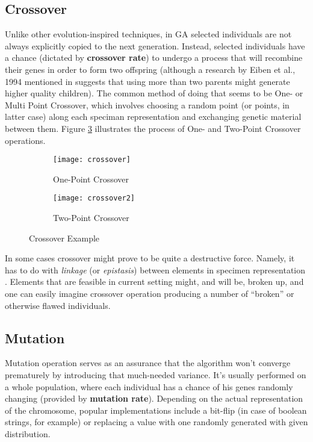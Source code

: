 \subsection{Crossover}
Unlike other evolution-inspired techniques, in GA selected individuals are not always explicitly copied to the next generation. Instead, selected individuals have a chance (dictated by \textbf{crossover rate}) to undergo a process that will recombine their genes in order to form two offspring (although a research by Eiben et al., 1994 mentioned in \cite{ksheperthesis} suggests that using more than two parents might generate higher quality children). The common method of doing that seems to be One- or Multi Point Crossover, which involves choosing a random point (or points, in latter case) along each speciman representation and exchanging genetic material between them. Figure \ref{fig:x crossoverexample} illustrates the process of One- and Two-Point Crossover operations.
\begin{figure}[h]
    \centering
    \begin{subfigure}[b]{0.5\textwidth}
        \centering
        \texttt{[image: crossover]}
        \caption{One-Point Crossover}
        \label{fig:onepointcrossover}
    \end{subfigure}
    \hfill
    \begin{subfigure}[b]{0.5\textwidth}
        \centering
        \texttt{[image: crossover2]}
        \caption{Two-Point Crossover}
        \label{fig:twopointcrossover}
    \end{subfigure}
    \caption{Crossover Example}
    \label{fig:x crossoverexample}
\end{figure}
In some cases crossover might prove to be quite a destructive force. Namely, it has to do with \textit{linkage} (or \textit{epistasis}) between elements in specimen representation \cite{Luke2013Metaheuristics}. Elements that are feasible in current setting might, and will be, broken up, and one can easily imagine crossover operation producing a number of ``broken'' or otherwise flawed individuals.

\subsection{Mutation}
Mutation operation serves as an assurance that the algorithm won't converge prematurely by introducing that much-needed variance. It's usually performed on a whole population, where each individual has a chance of his genes randomly changing (provided by \textbf{mutation rate}). Depending on the actual representation of the chromosome, popular implementations include a bit-flip (in case of boolean strings, for example) or replacing a value with one randomly generated with given distribution.
